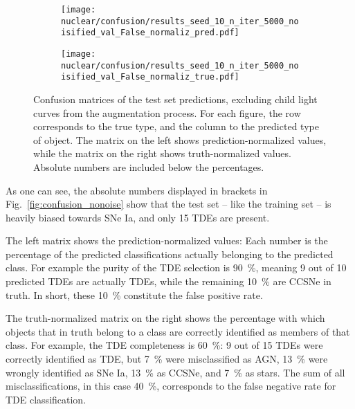 \begin{figure}[htb]
  \centering
  \begin{subfigure}[b]{0.49\textwidth}
    \centering
    \texttt{[image: nuclear/confusion/results\_seed\_10\_n\_iter\_5000\_noisified\_val\_False\_normaliz\_pred.pdf]}
  \end{subfigure}
  \begin{subfigure}[b]{0.49\textwidth}
    \centering
    \texttt{[image: nuclear/confusion/results\_seed\_10\_n\_iter\_5000\_noisified\_val\_False\_normaliz\_true.pdf]}
  \end{subfigure}
  \caption[Confusion matrices without augmentation]{Confusion matrices of the test set predictions, excluding child light curves from the augmentation process. For each figure, the row corresponds to the true type, and the column to the predicted type of object. The matrix on the left shows prediction-normalized values, while the matrix on the right shows truth-normalized values. Absolute numbers are included below the percentages.}
\end{figure}

As one can see, the absolute numbers displayed in brackets in Fig.~\ref{fig:confusion_nonoise} show that the test set -- like the training set -- is heavily biased towards SNe Ia, and only 15 TDEs are present.

The left matrix shows the prediction-normalized values: Each number is the percentage of the predicted classifications actually belonging to the predicted class. For example the purity of the TDE selection is \SI{90}{\percent}, meaning 9 out of 10 predicted TDEs are actually TDEs, while the remaining \SI{10}{\percent} are CCSNe in truth. In short, these \SI{10}{\percent} constitute the false positive rate.

The truth-normalized matrix on the right shows the percentage with which objects that in truth belong to a class are correctly identified as members of that class. For example, the TDE completeness is \SI{60}{\percent}: 9 out of 15 TDEs were correctly identified as TDE, but \SI{7}{\percent} were misclassified as AGN, \SI{13}{\percent} were wrongly identified as SNe Ia, \SI{13}{\percent} as CCSNe, and \SI{7}{\percent} as stars. The sum of all misclassifications, in this case \SI{40}{\percent}, corresponds to the false negative rate for TDE classification.


